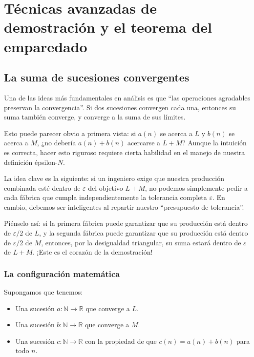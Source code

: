 \chapter{Técnicas avanzadas de demostración y el teorema del emparedado}

\section{La suma de sucesiones convergentes}

Una de las ideas más fundamentales en análisis es que ``las operaciones
agradables preservan la convergencia''. Si dos sucesiones convergen cada
una, entonces su suma también converge, y converge a la suma de sus
límites.

Esto puede parecer obvio a primera vista: si $a(n)$ se acerca a $L$ y
$b(n)$ se acerca a $M$, ¿no debería $a(n)+b(n)$ acercarse a $L+M$? Aunque
la intuición es correcta, hacer esto riguroso requiere cierta habilidad en
el manejo de nuestra definición épsilon-$N$.

La idea clave es la siguiente: si un ingeniero exige que nuestra producción
combinada esté dentro de $\varepsilon$ del objetivo $L+M$, no podemos
simplemente pedir a cada fábrica que cumpla independientemente la
tolerancia completa $\varepsilon$. En cambio, debemos ser inteligentes al
repartir nuestro ``presupuesto de tolerancia''.

Piénselo así: si la primera fábrica puede garantizar que su producción
está dentro de $\varepsilon/2$ de $L$, y la segunda fábrica puede
garantizar que su producción está dentro de $\varepsilon/2$ de $M$,
entonces, por la desigualdad triangular, su suma estará dentro de
$\varepsilon$ de $L+M$. ¡Este es el corazón de la demostración!

\subsection{La configuración matemática}

Supongamos que tenemos:
\begin{itemize}
  \item Una sucesión $a : \mathbb{N} \to \mathbb{R}$ que converge a $L$.
  \item Una sucesión $b : \mathbb{N} \to \mathbb{R}$ que converge a $M$.
  \item Una sucesión $c : \mathbb{N} \to \mathbb{R}$ con la propiedad de
        que $c(n) = a(n) + b(n)$ para todo $n$.
\end{itemize}

